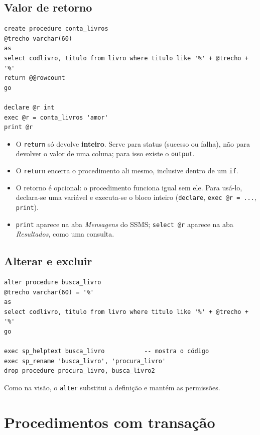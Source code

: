 \subsection{Valor de retorno}

\begin{lstlisting}
create procedure conta_livros
@trecho varchar(60)
as
select codlivro, titulo from livro where titulo like '%' + @trecho + '%'
return @@rowcount
go

declare @r int
exec @r = conta_livros 'amor'
print @r
\end{lstlisting}

\begin{itemize}
	\item O \texttt{return} só devolve \textbf{inteiro}. Serve para status
	(sucesso ou falha), não para devolver o valor de uma coluna; para isso
	existe o \texttt{output}.
	\item O \texttt{return} encerra o procedimento ali mesmo, inclusive
	dentro de um \texttt{if}.
	\item O retorno é opcional: o procedimento funciona igual sem ele. Para
	usá-lo, declara-se uma variável e executa-se o bloco inteiro
	(\texttt{declare}, \texttt{exec @r = ...}, \texttt{print}).
	\item \texttt{print} aparece na aba \emph{Mensagens} do SSMS;
	\texttt{select @r} aparece na aba \emph{Resultados}, como uma
	consulta.
\end{itemize}

\subsection{Alterar e excluir}

\begin{lstlisting}
alter procedure busca_livro
@trecho varchar(60) = '%'
as
select codlivro, titulo from livro where titulo like '%' + @trecho + '%'
go

exec sp_helptext busca_livro           -- mostra o código
exec sp_rename 'busca_livro', 'procura_livro'
drop procedure procura_livro, busca_livro2
\end{lstlisting}

Como na visão, o \texttt{alter} substitui a definição e mantém as
permissões.

\section{Procedimentos com transação}


